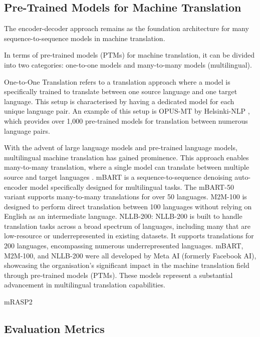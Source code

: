 \documentclass[a4paper]{article}
\begin{document}
\subsection{Pre-Trained Models for Machine Translation}

The encoder-decoder approach \cite{cho-2014-properties} remains as the foundation architecture for many sequence-to-sequence models in machine translation.

In terms of pre-trained models (PTMs) for machine translation, it can be divided into two categories: one-to-one models and many-to-many models (multilingual).

One-to-One Translation refers to a translation approach where a model is specifically trained to translate between one source language and one target language. This setup is characterised by having a dedicated model for each unique language pair. An example of this setup is OPUS-MT by Helsinki-NLP \cite{tiedemann-2020-opus-mt}, which provides over 1,000 pre-trained models for translation between numerous language pairs.

With the advent of large language models and pre-trained language models, multilingual machine translation has gained prominence. This approach enables many-to-many translation, where a single model can translate between multiple source and target languages \cite{aharoni-2019-massively-multilingual}. mBART \cite{liu-2020-mbart} is a sequence-to-sequence denoising auto-encoder model specifically designed for multilingual tasks. The mBART-50 variant supports many-to-many translations for over 50 languages. M2M-100 \cite{fan-2020-m2m100} is designed to perform direct translation between 100 languages without relying on English as an intermediate language. NLLB-200: NLLB-200 \cite{nllb200-2020} is built to handle translation tasks across a broad spectrum of languages, including many that are low-resource or underrepresented in existing datasets. It supports translations for 200 languages, encompassing numerous underrepresented languages. mBART, M2M-100, and NLLB-200 were all developed by Meta AI (formerly Facebook AI), showcasing the organisation's significant impact in the machine translation field through pre-trained models (PTMs). These models represent a substantial advancement in multilingual translation capabilities.

mRASP2 \cite{pan-2021-mrasp2}

\subsection{Evaluation Metrics}
\end{document}
